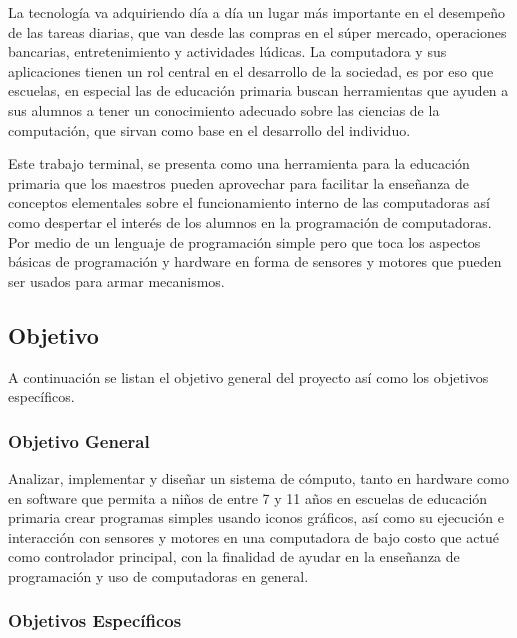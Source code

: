 \documentclass[letterpaper,10pt]{article}
\begin{document}
La tecnología va adquiriendo día a día un lugar más importante en el
desempeño de las tareas diarias, que van desde las compras en el súper mercado,
operaciones bancarias, entretenimiento y actividades lúdicas. La computadora 
y sus aplicaciones tienen un rol central en el desarrollo de la sociedad, 
es por eso que escuelas, en especial las de educación primaria
buscan herramientas que ayuden a sus alumnos a tener un conocimiento adecuado 
sobre las ciencias de la computación, que sirvan como base en el desarrollo
del individuo.
\newline

Este trabajo terminal, se presenta como una herramienta para la educación primaria 
que los maestros pueden aprovechar para facilitar la enseñanza de conceptos
elementales sobre el funcionamiento interno de las computadoras así como 
despertar el interés de los alumnos en la programación de computadoras.
Por medio de un lenguaje de programación simple pero que toca los aspectos 
básicas de programación y hardware en forma de sensores y motores que pueden
ser usados para armar mecanismos.

\subsection{Objetivo}

A continuación se listan el objetivo general del proyecto así como los 
objetivos específicos.

\subsubsection{Objetivo General}
Analizar, implementar y diseñar un sistema de cómputo, tanto en hardware como
en software que permita a niños de entre 7 y 11 años en escuelas de educación
primaria crear programas simples
usando iconos gráficos, así como su ejecución e interacción con sensores y motores
en una computadora de bajo costo que actué como controlador principal, 
con la finalidad de ayudar en la enseñanza de programación y uso de computadoras 
en general.

\subsubsection{Objetivos Específicos}
\end{document}
